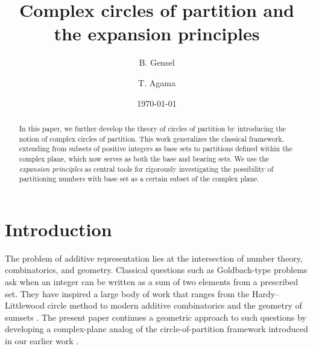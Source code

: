 \documentclass[12pt]{amsart}
\theoremstyle{definition}
\theoremstyle{remark}
\numberwithin{equation}{section}
\begin{document}
\title{Complex circles of partition and the expansion principles}

\author{B. Gensel}
\address{Berndt Gensel: Spittal on Drau, Austria}
\author{T. Agama}
\address{Theophilus Agama: Department of Mathematics, African Institute for mathematical sciences, Ghana.}


\date{\today}

\begin{abstract}
In this paper, we further develop the theory of circles of partition by introducing the notion of complex circles of partition. This work generalizes the classical framework, extending from subsets of positive integers as base sets to partitions defined within the complex plane, which now serves as both the base and bearing sets. We use the \emph{expansion principles} as central tools for rigorously investigating the possibility of partitioning numbers with base set as a certain subset of the complex plane.
\end{abstract}

\maketitle

\begingroup
  \setlength{\parskip}{6pt} %
  \tableofcontents
\endgroup


\section{Introduction}

The problem of additive representation lies at the intersection of number theory, combinatorics, and geometry. Classical questions such as Goldbach-type problems ask when an integer can be written as a sum of two elements from a prescribed set. They have inspired a large body of work that ranges from the Hardy--Littlewood circle method to modern additive combinatorics and the geometry of sumsets \cite{Nathanson,TaoVu,Green}. The present paper continues a geometric approach to such questions by developing a complex-plane analog of the circle-of-partition framework introduced in our earlier work \cite{CoP}.\\
\end{document}
